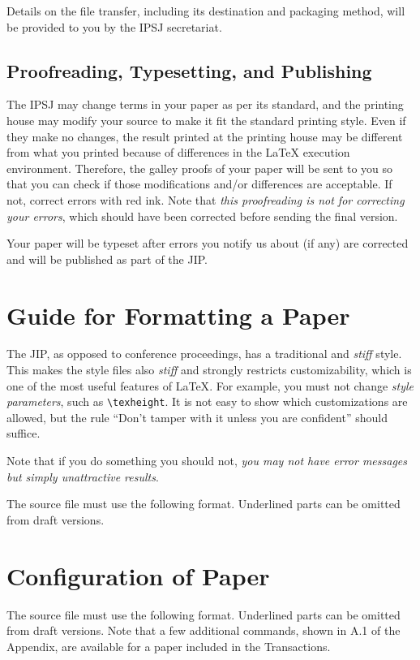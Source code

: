\documentclass[techrep,english]{ipsj}
\begin{document}
Details on the file transfer, including its destination and packaging
method, will be provided to you by the IPSJ secretariat.

\subsection{Proofreading, Typesetting, and Publishing}

The IPSJ may change terms in your paper as per its standard, and the
printing house may modify your source to make it fit the standard
printing style.  Even if they make no changes, the result printed at the
printing house may be different from what you printed because of
differences in the {\LaTeX} execution environment.  Therefore, the
galley proofs of your paper will be sent to you so that you can check if
those modifications and/or differences are acceptable.  If not, correct
errors with red ink.  Note that \textit{this proofreading is not for
correcting your errors}, which should have been corrected before sending
the final version.

Your paper will be typeset after errors you notify us about (if any) are
corrected and will be published as part of the JIP.

\section{Guide for Formatting a Paper}

The JIP, as opposed to conference proceedings, has a traditional and
\textit{stiff} style.  This makes the style files also \textit{stiff}
and strongly restricts customizability, which is one of the most useful
features of {\LaTeX}.  For example, you must not change \textit{style
parameters}, such as \verb+\texheight+.  It is not easy to show which
customizations are allowed, but the rule ``Don't tamper with it unless
you are confident'' should suffice.

Note that if you do something you should not, \textit{you may not have
error messages but simply unattractive results}.

The source file must use the following format.  Underlined parts can be
omitted from draft versions.

\section{Configuration of Paper}
\label{body}

The source file must use the following format.  Underlined parts can be
omitted from draft versions.  Note that a few additional commands, shown
in A.1 of the Appendix, are available for a paper included in the
Transactions.
\end{document}
